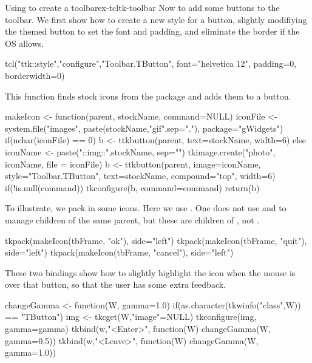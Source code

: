 \begin{example}{Using  to create a toolbar}{ex-tcltk-toolbar}
Now to add some buttons to the toolbar. We first show how to create a
new style for a button, slightly modifiying the themed button to set
the font and padding, and eliminate the border if the OS allows. 
\begin{Schunk}
\begin{Sinput}
 tcl("ttk::style","configure","Toolbar.TButton", 
     font="helvetica 12", padding=0, borderwidth=0)
\end{Sinput}
\end{Schunk}
This
 function finds stock icons from the 
package and adds them to a button.
\begin{Schunk}
\begin{Sinput}
 makeIcon <- function(parent, stockName, command=NULL) {
   iconFile <- system.file("images", 
                           paste(stockName,"gif",sep="."), 
                           package="gWidgets")
   if(nchar(iconFile) == 0) {
     b <- ttkbutton(parent, text=stockName, width=6)
   } else {
     iconName <- paste("::img::",stockName, sep="")
     tkimage.create("photo", iconName, file = iconFile)
     b <- ttkbutton(parent, image=iconName, 
                    style="Toolbar.TButton", text=stockName, 
                    compound="top", width=6)
     if(!is.null(command))
       tkconfigure(b, command=command)
   }
   return(b)
 }
\end{Sinput}
\end{Schunk}

To illustrate, we pack in some icons. Here we use .  
One does not use  and  to manage
children of the same parent, but these are children of ,
not .
\begin{Schunk}
\begin{Sinput}
 tkpack(makeIcon(tbFrame, "ok"), side="left")
 tkpack(makeIcon(tbFrame, "quit"), side="left")
 tkpack(makeIcon(tbFrame, "cancel"), side="left")
\end{Sinput}
\end{Schunk}

These two bindings show how to slightly highlight the icon when the
mouse is over that button, so that the user has some extra feedback.
\begin{Schunk}
\begin{Sinput}
 changeGamma <- function(W, gamma=1.0) {
   if(as.character(tkwinfo("class",W)) == "TButton") {
     img <- tkcget(W,"image"=NULL)
     tkconfigure(img, gamma=gamma)
   }
 }
 tkbind(w,"<Enter>", function(W) changeGamma(W, gamma=0.5))
 tkbind(w,"<Leave>", function(W) changeGamma(W, gamma=1.0))
\end{Sinput}
\end{Schunk}


\end{example}
